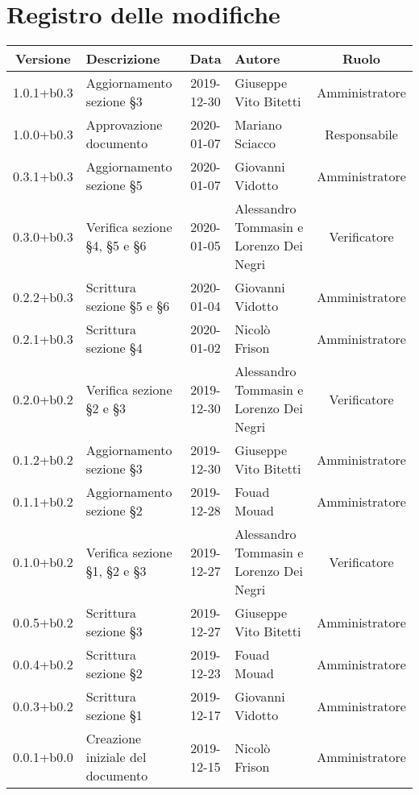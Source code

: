 \section*{Registro delle modifiche}

\begin{center}
	\begin{longtable}{|c|p{3cm}|c|p{4cm}|c|}
	\hline
	\rowcolor{lighter-grayer}
	\textbf{Versione} & \textbf{Descrizione} & \textbf{Data} & \textbf{Autore} & \textbf{Ruolo} \\
	\hline
	\endfirsthead

	1.0.1+b0.3 & Aggiornamento sezione \S3  & 2019-12-30 & Giuseppe Vito Bitetti & Amministratore \\
	\hline
	1.0.0+b0.3 & Approvazione documento & 2020-01-07 & Mariano Sciacco & Responsabile \\
	\hline
	0.3.1+b0.3 & Aggiornamento sezione \S5 & 2020-01-07 & Giovanni Vidotto & Amministratore \\
	\hline
	0.3.0+b0.3 & Verifica sezione \S4, \S5 e \S6 & 2020-01-05 & Alessandro Tommasin e Lorenzo Dei Negri & Verificatore \\
	\hline
	0.2.2+b0.3 & Scrittura sezione \S5 e \S6 & 2020-01-04 & Giovanni Vidotto & Amministratore \\
	\hline
	0.2.1+b0.3 &  Scrittura sezione \S4 & 2020-01-02 & Nicolò Frison & Amministratore \\
	\hline
	0.2.0+b0.2 & Verifica sezione \S2 e \S3 & 2019-12-30 & Alessandro Tommasin e Lorenzo Dei Negri & Verificatore \\
	\hline
	0.1.2+b0.2 & Aggiornamento sezione \S3  & 2019-12-30 & Giuseppe Vito Bitetti & Amministratore \\
	\hline
	0.1.1+b0.2 & Aggiornamento sezione \S2  & 2019-12-28 & Fouad Mouad & Amministratore \\
	\hline
	0.1.0+b0.2 & Verifica sezione \S1, \S2 e \S3 & 2019-12-27 & Alessandro Tommasin e Lorenzo Dei Negri & Verificatore \\
	\hline
	0.0.5+b0.2 & Scrittura sezione \S3 & 2019-12-27  & Giuseppe Vito Bitetti & Amministratore \\
	\hline
	0.0.4+b0.2 & Scrittura sezione \S2 & 2019-12-23 & Fouad Mouad & Amministratore \\
	\hline
	0.0.3+b0.2 & Scrittura sezione \S1 & 2019-12-17 & Giovanni Vidotto & Amministratore \\
	\hline
	0.0.1+b0.0 & Creazione iniziale del documento & 2019-12-15 & Nicolò Frison & Amministratore \\
	\hline

	\end{longtable}
\end{center}
